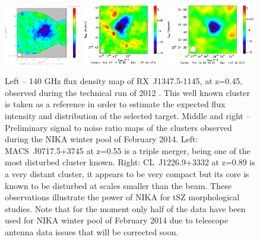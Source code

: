 \documentclass[11pt,a4paper,twoside,graphicx,color]{article}
\begin{document}
{\begin{figure}[h]
\centering	
\includegraphics[width=0.3\textwidth]{./RXJ1347.pdf}   
\hfill
\includegraphics[width=0.32\textwidth]{./MACSJ0717_SZ.pdf}
\hfill
\includegraphics[width=0.35\textwidth]{./CLJ1227.pdf}   
\caption{\footnotesize Left -- 140 GHz flux density map of RX~J1347.5-1145, at z=0.45, observed during the technical run of 2012 \cite{adam2013}. This well known cluster is taken as a reference in order to estimate the expected flux intensity and distribution of the selected target.
Middle and right -- Preliminary signal to noise ratio maps of the clusters observed during the NIKA winter pool of February 2014. Left: MACS~J0717.5+3745 at z=0.55 is a triple merger, being one of the most disturbed cluster known. Right: CL~J1226.9+3332 at z=0.89 is a very distant cluster, it appears to be very compact but its core is known to be disturbed at scales smaller than the beam. These observations illustrate the power of NIKA for tSZ morphological studies. Note that for the moment only half of the data have been used for NIKA winter pool of February 2014 due to telescope antenna data issues that will be corrected soon.}
\label{fig:clusterRun8}
\end{figure}

}
\end{document}
